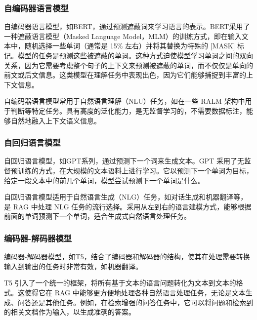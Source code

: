 \subsubsection{自编码器语言模型}
自编码器语言模型，如BERT，通过预测遮蔽词来学习语言的表示。BERT采用了一种遮蔽语言模型（Masked Language Model，MLM）的训练方式，即在输入文本中，随机选择一些单词（通常是 15\% 左右）并将其替换为特殊的 [MASK] 标记。模型的任务是预测这些被遮蔽的单词。这种方式迫使模型学习单词之间的双向关系，因为它需要考虑整个句子的上下文来预测被遮蔽的单词，而不仅仅是单向的前文或后文信息。这类模型在理解任务中表现出色，因为它们能够捕捉到丰富的上下文信息。

自编码器语言模型常用于自然语言理解（NLU）任务，如在一些 RALM 架构中用于判断等特定任务。具有高度的泛化能力，是无监督学习的，不需要数据标注，能够自然地融入上下文语义信息。
\subsubsection{自回归语言模型}
自回归语言模型，如GPT系列，通过预测下一个词来生成文本。GPT 采用了无监督预训练的方式，在大规模的文本语料上进行学习。它以预测下一个单词为目标，给定一段文本中的前几个单词，模型尝试预测下一个单词是什么。

自回归语言模型适用于自然语言生成（NLG）任务，如对话生成和机器翻译等，是 RAG 中处理 NLG 任务的流行选择。采用从左到右的语言建模方式，能够根据前面的单词预测下一个单词，适合生成式自然语言处理任务。
\subsubsection{编码器-解码器模型}
编码器-解码器模型，如T5，结合了编码器和解码器的结构，使其在处理需要转换输入到输出的任务时非常有效，如机器翻译。

T5 引入了一个统一的框架，将所有基于文本的语言问题转化为文本到文本的格式。这使得它在 RAG 中能够更方便地处理各种自然语言处理任务，无论是文本生成、问答还是其他任务。例如，在检索增强的问答任务中，它可以将问题和检索到的相关文档作为输入，以生成准确的答案。


